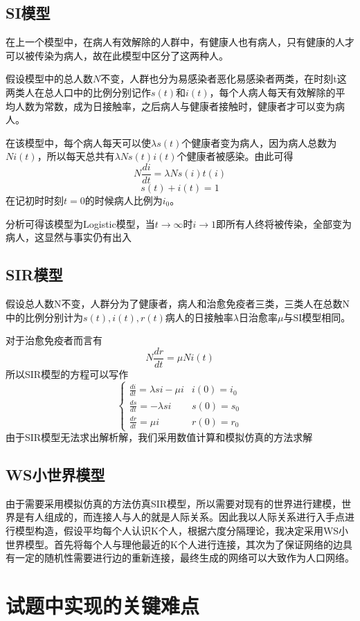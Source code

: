 \documentclass[supercite]{HustGraduPaper}
\begin{document}
	\subsection{SI模型}
	在上一个模型中，在病人有效解除的人群中，有健康人也有病人，只有健康的人才可以被传染为病人，故在此模型中区分了这两种人。
	\par
	假设模型中的总人数$N$不变，人群也分为易感染者恶化易感染者两类，在时刻t这两类人在总人口中的比例分别记作$s(t)$和$i(t)$，每个人病人每天有效解除的平均人数为常数，成为日接触率，之后病人与健康者接触时，健康者才可以变为病人。
	\par
	在该模型中，每个病人每天可以使$\lambda s(t)$个健康者变为病人，因为病人总数为$Ni(t)$，所以每天总共有$\lambda Ns(t)i(t)$个健康者被感染。由此可得
	$$N\frac{di}{dt} = \lambda Ns(i)t(i)$$
	$$s(t)+i(t) = 1$$
	在记初时时刻$t=0$的时候病人比例为$i_0$。\par
	分析可得该模型为Logistic模型，当$t \to \infty$时$i \to 1$即所有人终将被传染，全部变为病人，这显然与事实仍有出入
	
	\subsection{SIR模型}
	假设总人数N不变，人群分为了健康者，病人和治愈免疫者三类，三类人在总数N中的比例分别计为$s(t),i(t),r(t)$病人的日接触率$\lambda$日治愈率$\mu$与SI模型相同。\par
	对于治愈免疫者而言有
	$$N\frac{dr}{dt}=\mu N i(t)$$
	所以SIR模型的方程可以写作
	$$\left\{ \begin{array}{ll}
				\frac{di}{dt}=\lambda si-\mu i & i(0)=i_0\\
				\frac{ds}{dt}=-\lambda si & s(0)=s_0\\
				\frac{dr}{dt}=\mu i & r(0)=r_0
	\end{array} \right.$$
	由于SIR模型无法求出解析解，我们采用数值计算和模拟仿真的方法求解

	\subsection{WS小世界模型}
	由于需要采用模拟仿真的方法仿真SIR模型，所以需要对现有的世界进行建模，世界是有人组成的，而连接人与人的就是人际关系。因此我以人际关系进行入手点进行模型构造，假设平均每个人认识K个人，根据六度分隔理论，我决定采用WS小世界模型。首先将每个人与理他最近的K个人进行连接，其次为了保证网络的边具有一定的随机性需要进行边的重新连接，最终生成的网络可以大致作为人口网络。
	
	\section{试题中实现的关键难点}
\end{document}
